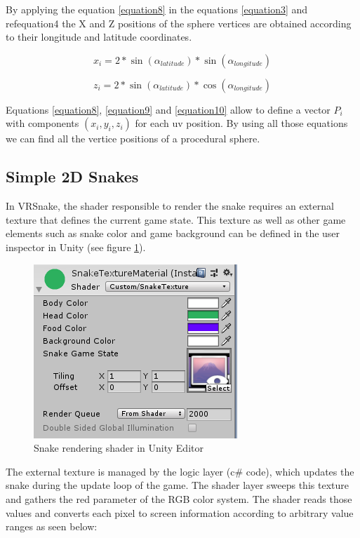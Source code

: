 \documentclass[runningheads]{llncs}
\begin{document}
By applying the equation \ref{equation8} in the equations \ref{equation3} and ref{equation4} the X and Z positions of the sphere vertices are obtained according to their longitude and latitude coordinates.

\begin{equation}
x_{i} = 2 * \sin(\alpha_{latitude}) * \sin(\alpha_{longitude})
\label{equation9}
\end{equation}

\begin{equation}
z_{i} = 2 * \sin(\alpha_{latitude}) * \cos(\alpha_{longitude})
\label{equation10}
\end{equation}

Equations \ref{equation8}, \ref{equation9} and \ref{equation10} allow to define a vector $P_i$ with components $(x_i, y_i, z_i)$ for each uv position. By using all those equations we can find all the vertice positions of a procedural sphere.

\subsection{Simple 2D Snakes}
\label{subsec:2d-snakes}
In VRSnake, the shader responsible to render the snake requires an external texture that defines the current game state. This texture as well as other game elements such as snake color and game background can be defined in the user inspector in Unity (see figure \ref{fig:snake_editor_unity}).

\begin{figure}[!h]
    \centering
    \includegraphics[scale=1]{src/hci2020-images/SnakeTextureMaterial.png}
    \caption{Snake rendering shader in Unity Editor}
    \label{fig:snake_editor_unity}
\end{figure}

The external texture is managed by the logic layer (c\# code), which updates the snake during the update loop of the game. The shader layer sweeps this texture and gathers the red parameter of the RGB color system. The shader reads those values and converts each pixel to screen information according to arbitrary value ranges as seen below:
\end{document}
